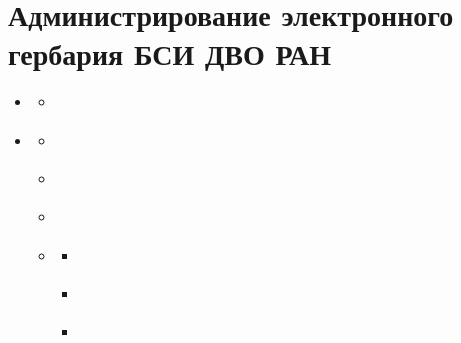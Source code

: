 \documentclass[letterpaper,10pt,russian]{sphinxmanual}
\begin{document}
\chapter{Администрирование электронного гербария БСИ ДВО РАН}
\label{\detokenize{main::doc}}\label{\detokenize{main:id1}}
\begin{sphinxShadowBox}
\begin{itemize}
\item {} 
\label{\detokenize{main:id71}}{\hyperref[\detokenize{main:id3}]{}}
\begin{itemize}
\item {} 
\label{\detokenize{main:id72}}{\hyperref[\detokenize{main:index-0}]{}}

\end{itemize}

\item {} 
\label{\detokenize{main:id73}}{\hyperref[\detokenize{main:index-1}]{}}
\begin{itemize}
\item {} 
\label{\detokenize{main:id74}}{\hyperref[\detokenize{main:index-2}]{}}

\item {} 
\label{\detokenize{main:id75}}{\hyperref[\detokenize{main:index-3}]{}}

\item {} 
\label{\detokenize{main:id76}}{\hyperref[\detokenize{main:index-4}]{}}

\item {} 
\label{\detokenize{main:id77}}{\hyperref[\detokenize{main:id9}]{}}
\begin{itemize}
\item {} 
\label{\detokenize{main:id78}}{\hyperref[\detokenize{main:index-5}]{}}

\item {} 
\label{\detokenize{main:id79}}{\hyperref[\detokenize{main:index-6}]{}}

\item {} 
\label{\detokenize{main:id80}}{\hyperref[\detokenize{main:index-7}]{}}


\end{itemize}
\end{itemize}
\end{itemize}
\end{sphinxShadowBox}
\end{document}

